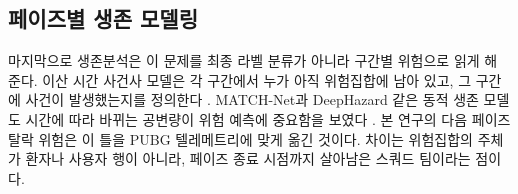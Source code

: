 \subsection{페이즈별 생존 모델링}

마지막으로 생존분석은 이 문제를 최종 라벨 분류가 아니라 구간별 위험으로 읽게 해
준다. 이산 시간 사건사 모델은 각 구간에서 누가 아직 위험집합에 남아 있고, 그
구간에 사건이 발생했는지를 정의한다
\cite{allison1982discrete,singer1993discrete}. MATCH-Net과 DeepHazard 같은 동적
생존 모델도 시간에 따라 바뀌는 공변량이 위험 예측에 중요함을 보였다
\cite{jarrett2018matchnet,rava2020deephazard}. 본 연구의 다음 페이즈 탈락 위험은
이 틀을 PUBG 텔레메트리에 맞게 옮긴 것이다. 차이는 위험집합의 주체가 환자나
사용자 행이 아니라, 페이즈 종료 시점까지 살아남은 스쿼드 팀이라는 점이다.

